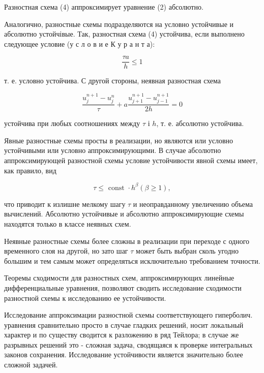 \documentclass[10pt]{article}
\begin{document}
Разностная схема (4) аппроксимирует уравнение (2) абсолютно.



Аналогично, разностные схемы подразделяются на условно устойчивые и абсолютно устойчівые. Так, разностная схема (4) устойчива, если выполнено следующее условие (у с л о в и е К у р а н т а):



\[

\frac{\tau a}{h} \leqslant 1

\]



т. е. условно устойчива. С другой стороны, неявная разностная схема



\[

\frac{u_{j}^{n+1}-u_{j}^{n}}{\tau}+a \frac{u_{j+1}^{n+1}-u_{j-1}^{n+1}}{2 h}=0

\]



устойчива при любых соотношениях между $\tau$ і $h$, т. е. абсолютно устойчива.



Явные разностные схемы просты в реализации, но являются или условно устойчивыми или условно аппроксимирующими. В случае абсолютно аппроксимирующей разностной схемы условие устойчивости явной схемы имеет, как правило, вид



\[

\tau \leqslant \text { const } \cdot h^{\beta}(\beta \geqslant 1),

\]



что приводит к излишне мелкому шагу $\tau$ и неоправданному увеличению объема вычислений. Абсолютно устойчивые и абсолютно аппроксимирующие схемы находятся только в классе неявных схем.



Неявные разностные схемы более сложны в реализации при переходе с одного временного слоя на другой, но зато шаг $\tau$ может быть выбран сколь угодно большим и тем самым может определяться исключительно требованием точности.



Теоремы сходимости для разностных схем, аппроксимирующих линейные дифференциальные уравнения, позволяют сводить исследование сходимости разностной схемы к исследованию ее устойчивости.



Исследование аппроксимации разностной схемы соответствующего гиперболич. уравнения сравнительно просто в случае гладких решений, носит локальный характер и по существу сводится к разложению в ряд Тейлора; в случае же разрывных решений это - сложная задача, сводящаяся к проверке интегральных законов сохранения. Исследование устойчивости является значительно более сложной задачей.
\end{document}

